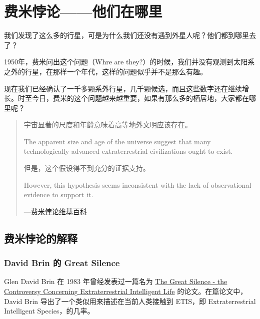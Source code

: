 \documentclass[letterpaper,10pt,english]{sphinxmanual}
\begin{document}
\section{费米悖论——他们在哪里}
\label{fermi::doc}\label{fermi:id1}
我们发现了这么多的行星，可是为什么我们还没有遇到外星人呢？他们都到哪里去了？

1950年，费米问出这个问题（Whre are they?）的时候，我们并没有观测到太阳系之外的行星，在那样一个年代，这样的问题似乎并不是那么有趣。

现在我们已经确认了一千多颗系外行星，几千颗候选，而且这些数字还在继续增长。时至今日，费米的这个问题越来越重要，如果有那么多的栖居地，大家都在哪里呢？
\begin{quote}

宇宙显著的尺度和年龄意味着高等地外文明应该存在。

The apparent size and age of the universe suggest that many technologically advanced extraterrestrial civilizations ought to exist.

但是，这个假设得不到充分的证据支持。

However, this hypothesis seems inconsistent with the lack of observational evidence to support it.

\begin{flushright}
---\href{http://zh.wikipedia.org/wiki/\%E8\%B4\%B9\%E7\%B1\%B3\%E6\%82\%96\%E8\%AE\%BA}{费米悖论\textbar{}维基百科}
\end{flushright}
\end{quote}


\subsection{费米悖论的解释}
\label{fermi:index-1}\label{fermi:id3}

\subsubsection{David Brin 的 Great Silence}
\label{fermi:david-brin-great-silence}
Glen David Brin 在 1983 年曾经发表过一篇名为 \href{http://www.brin-l.com/downloads/silence.pdf}{The Great Silence - the Controversy Concerning Extraterrestrial Intelligent Life} 的论文。在篇论文中，David Brin 导出了一个类似用来描述在当前人类接触到 ETIS，即 Extraterrestrial Intelligent Species，的几率。
\end{document}
